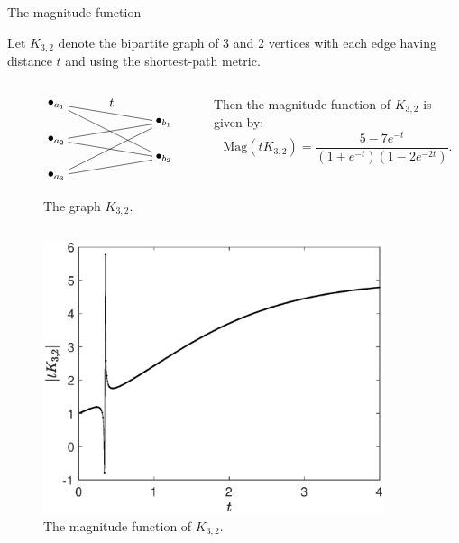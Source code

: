 \documentclass[12pt,mathserif]{beamer}
\begin{document}
\begin{frame}[allowframebreaks]{The magnitude function}
\framebreak

\begin{example}
Let $K_{3,2}$ denote the bipartite graph of 3 and 2 vertices with each edge having distance $t$ and using the shortest-path metric.
\begin{columns}
\begin{column}{0.45\textwidth}
\begin{figure}
\begin{equation*}
\begin{xy}
(0,0)*+{\bullet_{a_1}}="a1";
(0,-10)*+{\bullet_{a_2}}="a2";
(0,-20)*+{\bullet_{a_3}}="a3";
(30,-5)*+{\bullet_{b_1}}="b1";
(30,-15)*+{\bullet_{b_2}}="b2";
{\ar@{-} "a1";"b1"}?*!/_3mm/{t};
{\ar@{-} "a2";"b1"};
{\ar@{-} "a3";"b1"};
{\ar@{-} "a1";"b2"};
{\ar@{-} "a2";"b2"};
{\ar@{-} "a3";"b2"};
\end{xy}
\end{equation*}
\caption{\label{fig:K32}The graph $K_{3,2}$.}
\end{figure}
\end{column}
\begin{column}{0.50\textwidth}
Then the magnitude function of $K_{3,2}$ is given by:
\begin{equation*}
\text{Mag}\left(tK_{3,2}\right) = \frac{5-7e^{-t}}{(1+e^{-t})(1-2e^{-2t})}.
\end{equation*}
\end{column}
\end{columns}
\end{example}
\end{frame}

\begin{frame}[plain]
\begin{figure}
\includegraphics[width=10cm]{K32.eps}\caption{\label{fig:K32magfun}The magnitude function of $K_{3,2}$.}
\end{figure}
\end{frame}
\end{document}
